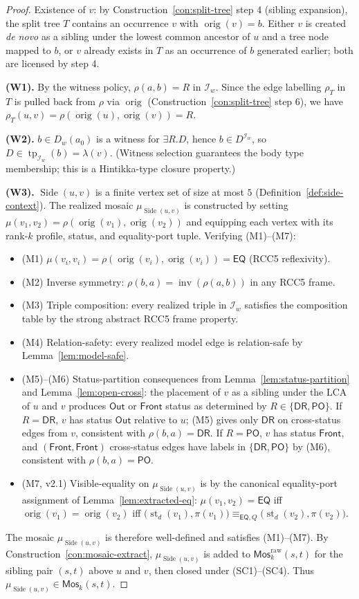 \documentclass[11pt]{article}
\theoremstyle{definition}
\theoremstyle{remark}
\newcommand{\DR}{\mathsf{DR}}
\newcommand{\PO}{\mathsf{PO}}
\newcommand{\EQ}{\mathsf{EQ}}
\newcommand{\tp}{\operatorname{tp}}
\newcommand{\st}{\operatorname{st}}
\newcommand{\inv}{\operatorname{inv}}
\newcommand{\orig}{\operatorname{orig}}
\newcommand{\Out}{\mathsf{Out}}
\newcommand{\Front}{\mathsf{Front}}
\newcommand{\Mos}{\mathsf{Mos}}
\newcommand{\eqQ}{\equiv_{\EQ,Q}}
\newcommand{\Side}{\operatorname{Side}}
\begin{document}
\begin{proof}
Existence of $v$: by Construction~\ref{con:split-tree} step 4
(sibling expansion), the split tree $T$ contains an occurrence $v$
with $\orig(v) = b$.  Either $v$ is created \emph{de novo} as a
sibling under the lowest common ancestor of $u$ and a tree node
mapped to $b$, or $v$ already exists in $T$ as an occurrence of $b$
generated earlier; both are licensed by step 4.

\noindent\textbf{(W1).}\;
By the witness policy, $\rho(a,b) = R$ in $\mathcal{I}_w$.  Since
the edge labelling $\rho_T$ in $T$ is pulled back from $\rho$ via
$\orig$ (Construction~\ref{con:split-tree} step 6), we have
$\rho_T(u,v) = \rho(\orig(u),\orig(v)) = R$.

\noindent\textbf{(W2).}\;
$b \in D_w(a_0)$ is a witness for $\exists R.D$, hence
$b\in D^{\mathcal{I}_w}$, so $D\in\tp_{\mathcal{I}_w}(b) =
\lambda(v)$.  (Witness selection guarantees the body type
membership; this is a Hintikka-type closure property.)

\noindent\textbf{(W3).}\;
$\Side(u,v)$ is a finite vertex set of size at most $5$
(Definition~\ref{def:side-context}).  The realized mosaic
$\mu_{\Side(u,v)}$ is constructed by setting
$\mu(v_1,v_2) = \rho(\orig(v_1),\orig(v_2))$ and equipping each
vertex with its rank-$k$ profile, status, and equality-port tuple.
Verifying (M1)--(M7):
\begin{itemize}
\item (M1) $\mu(v_i,v_i) = \rho(\orig(v_i),\orig(v_i)) = \EQ$
  (RCC5 reflexivity).
\item (M2) Inverse symmetry: $\rho(b,a) = \inv(\rho(a,b))$ in any
  RCC5 frame.
\item (M3) Triple composition: every realized triple in
  $\mathcal{I}_w$ satisfies the composition table by the strong
  abstract RCC5 frame property.
\item (M4) Relation-safety: every realized model edge is
  relation-safe by Lemma~\ref{lem:model-safe}.
\item (M5)--(M6) Status-partition consequences from
  Lemma~\ref{lem:status-partition} and
  Lemma~\ref{lem:open-cross}: the placement of $v$ as a sibling under
  the LCA of $u$ and $v$ produces $\Out$ or $\Front$ status as
  determined by $R\in\{\DR,\PO\}$.  If $R=\DR$, $v$ has status $\Out$
  relative to $u$; (M5) gives only $\DR$ on cross-status edges from
  $v$, consistent with $\rho(b,a) = \DR$.  If $R=\PO$, $v$ has status
  $\Front$, and $(\Front,\Front)$ cross-status edges have labels in
  $\{\DR,\PO\}$ by (M6), consistent with $\rho(b,a) = \PO$.
\item (M7, v2.1) Visible-equality on $\mu_{\Side(u,v)}$ is by the
  canonical equality-port assignment of
  Lemma~\ref{lem:extracted-eq}: $\mu(v_1,v_2) = \EQ$ iff
  $\orig(v_1) = \orig(v_2)$ iff
  $\bigl(\st_d(v_1),\pi(v_1)\bigr)\eqQ\bigl(\st_d(v_2),\pi(v_2)\bigr)$.
\end{itemize}
The mosaic $\mu_{\Side(u,v)}$ is therefore well-defined and
satisfies (M1)--(M7).  By Construction~\ref{con:mosaic-extract},
$\mu_{\Side(u,v)}$ is added to $\Mos_k^{\mathrm{raw}}(s,t)$ for the
sibling pair $(s,t)$ above $u$ and $v$, then closed under
(SC1)--(SC4).  Thus $\mu_{\Side(u,v)}\in\Mos_k(s,t)$.


\end{proof}
\end{document}
